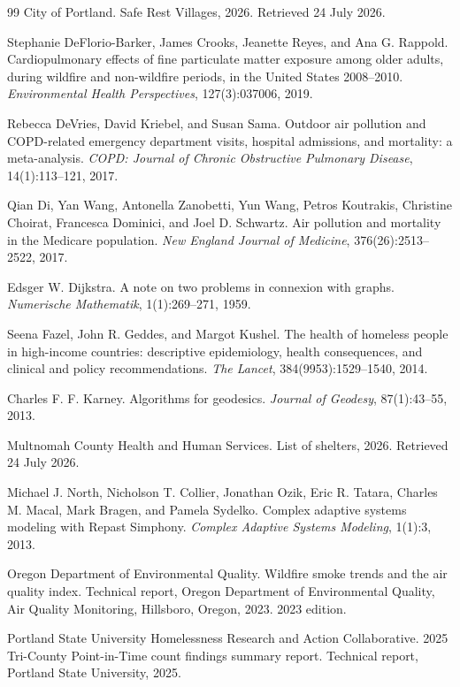 \documentclass[graybox]{svmult}
\begin{document}
\begin{thebibliography}{99}
City of Portland. Safe Rest Villages, 2026. Retrieved 24 July 2026.

Stephanie DeFlorio-Barker, James Crooks, Jeanette Reyes, and Ana G. Rappold.
Cardiopulmonary effects of fine particulate matter exposure among older adults,
during wildfire and non-wildfire periods, in the United States 2008--2010.
\emph{Environmental Health Perspectives}, 127(3):037006, 2019.

Rebecca DeVries, David Kriebel, and Susan Sama. Outdoor air pollution and
COPD-related emergency department visits, hospital admissions, and mortality: a
meta-analysis. \emph{COPD: Journal of Chronic Obstructive Pulmonary Disease},
14(1):113--121, 2017.

Qian Di, Yan Wang, Antonella Zanobetti, Yun Wang, Petros Koutrakis, Christine
Choirat, Francesca Dominici, and Joel D. Schwartz. Air pollution and mortality in
the Medicare population. \emph{New England Journal of Medicine},
376(26):2513--2522, 2017.

Edsger W. Dijkstra. A note on two problems in connexion with graphs.
\emph{Numerische Mathematik}, 1(1):269--271, 1959.

Seena Fazel, John R. Geddes, and Margot Kushel. The health of homeless people in
high-income countries: descriptive epidemiology, health consequences, and
clinical and policy recommendations. \emph{The Lancet}, 384(9953):1529--1540,
2014.

Charles F. F. Karney. Algorithms for geodesics. \emph{Journal of Geodesy},
87(1):43--55, 2013.

Multnomah County Health and Human Services. List of shelters, 2026. Retrieved 24
July 2026.

Michael J. North, Nicholson T. Collier, Jonathan Ozik, Eric R. Tatara, Charles M.
Macal, Mark Bragen, and Pamela Sydelko. Complex adaptive systems modeling with
Repast Simphony. \emph{Complex Adaptive Systems Modeling}, 1(1):3, 2013.

Oregon Department of Environmental Quality. Wildfire smoke trends and the air
quality index. Technical report, Oregon Department of Environmental Quality, Air
Quality Monitoring, Hillsboro, Oregon, 2023. 2023 edition.

Portland State University Homelessness Research and Action Collaborative. 2025
Tri-County Point-in-Time count findings summary report. Technical report,
Portland State University, 2025.


\end{thebibliography}
\end{document}
